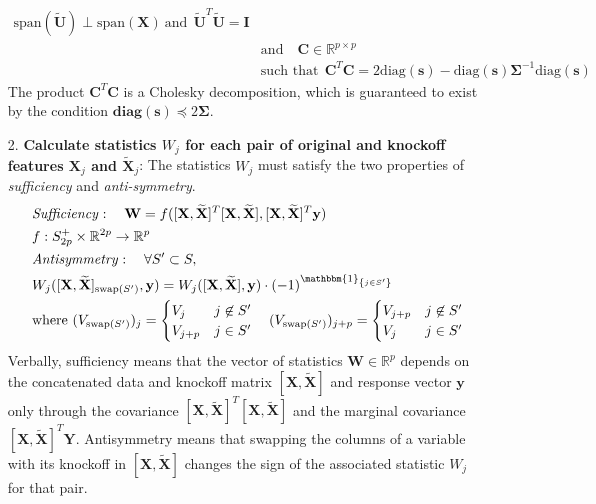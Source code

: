 \documentclass[]{scrartcl}
\newcommand{\1}[1]{\mathbbm{1}_{\left\{#1\right\}}}
\begin{document}
\begin{itemize}
\begin{align*}
		\text{span}(\widetilde{\mathbf{U}}) \perp \text{span}(\mathbf{\mathbf{X}})\ \text{and}\ \  \widetilde{\mathbf{U}}^{T}\widetilde{\mathbf{U}} = \mathbf{I}\\
		&\text{and}\quad  \mathbf{C} \in \mathbb{R}^{p \times p}\\
		&\text{such that}\ \ \mathbf{C}^{T}\mathbf{C} = 2\text{diag}(\mathbf{s}) - \text{diag}(\mathbf{s})\pmb\Sigma^{-1}\text{diag}(\mathbf{s})
	\end{align*}
	The product $\mathbf{C}^{T}\mathbf{C}$ is a Cholesky decomposition, which is guaranteed to exist by the condition $\mathbf{diag}(\mathbf{s}) \preceq 2\pmb\Sigma$.
	\item[2.] \textbf{Calculate statistics $W_{j}$ for each pair of original and knockoff features $\mathbf{\mathbf{X}}_{j}$ and $\widetilde{\mathbf{\mathbf{X}}}_{j}$}:
	The statistics $W_{j}$ must satisfy the two properties of \textit{sufficiency} and \textit{anti-symmetry}.
	\begin{align*}
		&\mathit{Sufficiency}:\quad \mathbf{W} = f([\mathbf{X}, \widetilde{\mathbf{X}}]^{T}[\mathbf{X}, \widetilde{\mathbf{X}}], [\mathbf{X}, \widetilde{\mathbf{X}}]^{T}\mathbf{y})\\
		&f: S^{+}_{2p} \times \mathbb{R}^{2p} \to \mathbb{R}^{p}\\
		&\mathit{Antisymmetry}:\quad \forall S' \subset S,\\
		& W_{j}([\mathbf{X}, \widetilde{\mathbf{X}}]_{\text{swap}(S')}, \mathbf{y}) = W_{j}([\mathbf{X}, \widetilde{\mathbf{X}}], \mathbf{y})\cdot (-1)^{\1{j\in S'}}\\
		&\text{where}\ (V_{\text{swap}(S')})_{j} = \begin{cases}
		V_{j} & j \not \in S'\\
		V_{j+ p} & j \in S'
		\end{cases}
		\quad (V_{\text{swap}(S')})_{j+p} = \begin{cases}
		V_{j+ p} & j \not \in S'\\
		V_{j} & j \in S'
		\end{cases}
	\end{align*}
	Verbally, sufficiency means that the vector of statistics $\mathbf{W} \in \mathbb{R}^{p}$ depends on the concatenated data and knockoff matrix $[\mathbf{X}, \widetilde{\mathbf{X}}]$ and response vector $\mathbf{y}$ only through the covariance $[\mathbf{X}, \widetilde{\mathbf{X}}]^{T}[\mathbf{X}, \widetilde{\mathbf{X}}]$ and the marginal covariance $[\mathbf{X}, \widetilde{\mathbf{X}}]^{T}\mathbf{Y}$. Antisymmetry means that swapping the columns of a variable with its knockoff in $[\mathbf{X}, \widetilde{\mathbf{X}}]$ changes the sign of the associated statistic $W_{j}$ for that pair. 

\end{itemize}
\end{document}
